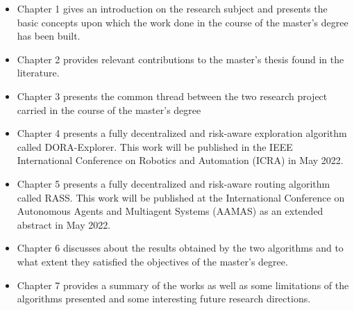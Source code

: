 \begin{itemize}
    \item Chapter 1 gives an introduction on the research subject and presents the basic concepts upon which the work done in the course of the master's degree has been built. 
    \item Chapter 2 provides relevant contributions to the master's thesis found in the literature.
    \item Chapter 3 presents the common thread between the two research project carried in the course of the master's degree
    \item Chapter 4 presents a fully decentralized and risk-aware exploration algorithm called DORA-Explorer. This work will be published in the IEEE International Conference on Robotics and Automation (ICRA) in May 2022.
    \item Chapter 5 presents a fully decentralized and risk-aware routing algorithm called RASS. This work will be published at the International Conference on Autonomous Agents and Multiagent Systems (AAMAS) as an extended abstract in May 2022. 
    \item Chapter 6 discusses about the results obtained by the two algorithms and to what extent they satisfied the objectives of the master's degree. 
    \item Chapter 7 provides a summary of the works as well as some limitations of the algorithms presented and some interesting future research directions.
\end{itemize}




